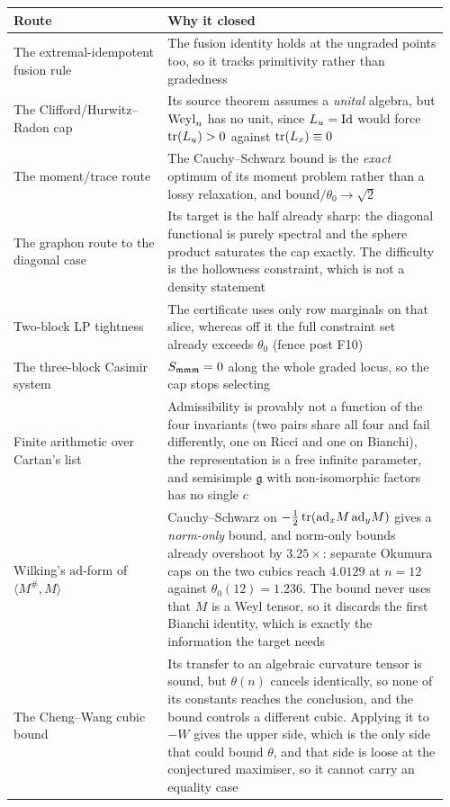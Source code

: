 \begin{longtable}{@{}p{0.34\linewidth}p{0.62\linewidth}@{}}
\toprule
\textbf{Route} & \textbf{Why it closed} \\
\midrule
\endhead
The extremal-idempotent fusion rule & The fusion identity holds at the ungraded points too, so it tracks primitivity rather than gradedness \\
The Clifford/Hurwitz--Radon cap & Its source theorem assumes a \emph{unital} algebra, but $\mathrm{Weyl}_n$ has no unit, since $L_u=\mathrm{Id}$ would force $\operatorname{tr}(L_u)>0$ against $\operatorname{tr}(L_x)\equiv0$ \\
The moment/trace route & The Cauchy--Schwarz bound is the \emph{exact} optimum of its moment problem rather than a lossy relaxation, and $\mathrm{bound}/\theta_0\to\sqrt2$ \\
The graphon route to the diagonal case & Its target is the half already sharp: the diagonal functional is purely spectral and the sphere product saturates the cap exactly. The difficulty is the hollowness constraint, which is not a density statement \\
Two-block LP tightness & The certificate uses only row marginals on that slice, whereas off it the full constraint set already exceeds $\theta_0$ (fence post F10) \\
The three-block Casimir system & $S_{\mathfrak{m}\mathfrak{m}\mathfrak{m}}=0$ along the whole graded locus, so the cap stops selecting \\
Finite arithmetic over Cartan's list & Admissibility is provably not a function of the four invariants (two pairs share all four and fail differently, one on Ricci and one on Bianchi), the representation is a free infinite parameter, and semisimple $\mathfrak g$ with non-isomorphic factors has no single $c$ \\
Wilking's $\mathrm{ad}$-form of $\langle M^{\#},M\rangle$ & Cauchy--Schwarz on $-\tfrac12\operatorname{tr}(\mathrm{ad}_xM\,\mathrm{ad}_yM)$ gives a \emph{norm-only} bound, and norm-only bounds already overshoot by $3.25\times$: separate Okumura caps on the two cubics reach $4.0129$ at $n=12$ against $\theta_0(12)=1.236$. The bound never uses that $M$ is a Weyl tensor, so it discards the first Bianchi identity, which is exactly the information the target needs \\
The Cheng--Wang cubic bound & Its transfer to an algebraic curvature tensor is sound, but $\theta(n)$ cancels identically, so none of its constants reaches the conclusion, and the bound controls a different cubic. Applying it to $-W$ gives the upper side, which is the only side that could bound $\theta$, and that side is loose at the conjectured maximiser, so it cannot carry an equality case \\

\end{longtable}
